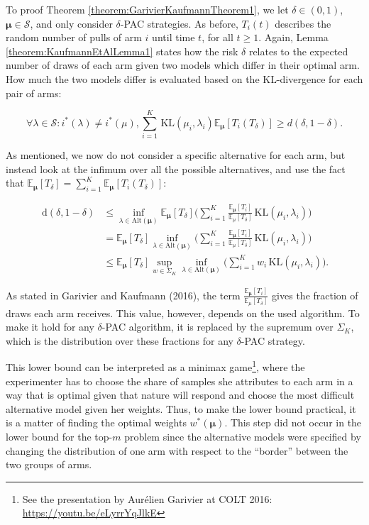 \documentclass[11pt,]{article}
\let\rmarkdownfootnote\footnote%
\def\footnote{\protect\rmarkdownfootnote}
\newcommand{\KL}{\,\text{KL}}
\newcommand{\der}{\,\text{d}}
\begin{document}
To proof Theorem \ref{theorem:GarivierKaufmannTheorem1}, we let
\(\delta \in (0,1)\), \(\bm{\mu} \in \mathcal{S}\), and only consider
\(\delta\)-PAC strategies. As before, \(T_i(t)\) describes the random
number of pulls of arm \(i\) until time \(t\), for all \(t\geq 1\).
Again, Lemma \ref{theorem:KaufmannEtAlLemma1} states how the risk
\(\delta\) relates to the expected number of draws of each arm given two
models which differ in their optimal arm. How much the two models differ
is evaluated based on the KL-divergence for each pair of arms:

\begin{equation*}
\forall \lambda \in \mathcal{S}: i^*(\lambda) \neq i^*(\mu), \sum_{i=1}^K \KL(\mu_i,\lambda_i)\mathbb{E}_{\bm{\mu}}[T_i(T_{\delta})] \geq d(\delta, 1- \delta).
\end{equation*}

As mentioned, we now do not consider a specific alternative for each
arm, but instead look at the infimum over all the possible alternatives,
and use the fact that
\(\mathbb{E}_{\bm{\mu}}[T_{\delta}] = \sum_{i=1}^K \mathbb{E}_{\bm{\mu}}[T_i(T_{\delta})]\):

\begin{align*}
\der(\delta, 1-\delta) & \leq \inf_{\lambda \in \text{Alt}(\bm{\mu})} \mathbb{E}_{\bm{\mu}}[T_{\delta}] \Big(\sum_{i=1}^K \frac{\mathbb{E}_{\bm{\mu}}[T_i]}{\mathbb{E}_{\mu}[T_{\delta}]} \KL(\mu_i, \lambda_i)\Big) \\
& = \mathbb{E}_{\bm{\mu}}[T_{\delta}] \inf_{\lambda \in \text{Alt}(\bm{\mu})} \Big(\sum_{i=1}^K \frac{\mathbb{E}_{\bm{\mu}}[T_i]}{\mathbb{E}_{\mu}[T_{\delta}]} \KL(\mu_i, \lambda_i)\Big) \\
& \leq \mathbb{E}_{\bm{\mu}}[T_{\delta}] \sup_{w \in \Sigma_K} \inf_{\lambda \in \text{Alt}(\bm{\mu})} \Big(\sum_{i=1}^K w_i \KL(\mu_i, \lambda_i)\Big).
\end{align*}

As stated in Garivier and Kaufmann (2016), the term
\(\frac{\mathbb{E}_{\bm{\mu}}[T_i]}{\mathbb{E}_{\mu}[T_{\delta}]}\)
gives the fraction of draws each arm receives. This value, however,
depends on the used algorithm. To make it hold for any \(\delta\)-PAC
algorithm, it is replaced by the supremum over \(\Sigma_K\), which is
the distribution over these fractions for any \(\delta\)-PAC strategy.

This lower bound can be interpreted as a minimax game\footnote{See the
  presentation by Aurélien Garivier at COLT 2016:
  \url{https://youtu.be/eLyrrYqJlkE}}, where the experimenter has to
choose the share of samples she attributes to each arm in a way that is
optimal given that nature will respond and choose the most difficult
alternative model given her weights. Thus, to make the lower bound
practical, it is a matter of finding the optimal weights
\(w^*(\bm{\mu})\). This step did not occur in the lower bound for the
top-\(m\) problem since the alternative models were specified by
changing the distribution of one arm with respect to the ``border''
between the two groups of arms.
\end{document}
